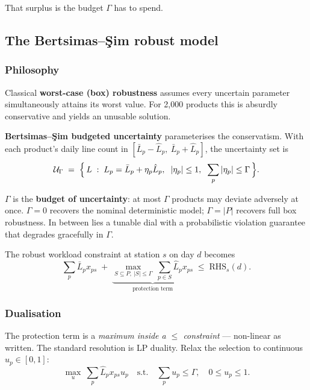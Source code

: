 \documentclass[11pt,a4paper]{article}
\begin{document}
That surplus is the budget $\Gamma$ has to spend.

\subsection{\texorpdfstring{The Bertsimas--\c{S}im robust model}{The Bertsimas-Sim robust model}}

\subsubsection*{Philosophy}

Classical \textbf{worst-case (box) robustness} assumes every uncertain
parameter simultaneously attains its worst value. For 2{,}000 products this is
absurdly conservative and yields an unusable solution.

\textbf{Bertsimas--\c{S}im budgeted uncertainty} parameterises the
conservatism. With each product's daily line count in
$[\bar L_p - \hat L_p,\ \bar L_p + \hat L_p]$, the uncertainty set is
\begin{equation}
  \mathcal{U}_\Gamma \;=\;
  \Bigl\{\, L \;:\; L_p = \bar L_p + \eta_p \hat L_p,\;\;
  |\eta_p|\le 1,\;\; \sum_p |\eta_p| \le \Gamma \,\Bigr\}.
  \label{eq:uset}
\end{equation}

$\Gamma$ is the \textbf{budget of uncertainty}: at most $\Gamma$ products may
deviate adversely at once. $\Gamma=0$ recovers the nominal deterministic model;
$\Gamma=|P|$ recovers full box robustness. In between lies a tunable dial with
a probabilistic violation guarantee that degrades gracefully in $\Gamma$.

The robust workload constraint at station $s$ on day $d$ becomes
\begin{equation}
  \sum_p \bar L_p x_{ps}
  \;+\;
  \underbrace{\max_{S\subseteq P,\ |S|\le\Gamma}\ \sum_{p\in S}\hat L_p x_{ps}}_{\text{protection term}}
  \;\le\; \mathrm{RHS}_s(d).
  \label{eq:robustraw}
\end{equation}

\subsubsection*{Dualisation}

The protection term is a \emph{maximum inside a $\le$ constraint} ---
non-linear as written. The standard resolution is LP duality. Relax the
selection to continuous $u_p\in[0,1]$:
\begin{equation}
  \max_u \ \sum_p \hat L_p x_{ps} u_p
  \quad\text{s.t.}\quad
  \sum_p u_p \le \Gamma, \quad 0\le u_p \le 1 .
  \label{eq:innerlp}
\end{equation}
\end{document}
